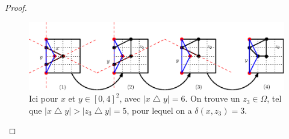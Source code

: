 \documentclass[11pt]{article}
\begin{document}
\begin{proof}





  \begin{figure}
    \begin{center}
      \includegraphics[scale=0.7]{assets/transfo}
      \caption{Ici pour $x$ et $y \in [0,4]^2$, avec $|x \bigtriangleup y| = 6$. On trouve un $z_3 \in \Omega$, tel que $|x \bigtriangleup y| > |z_3 \bigtriangleup y| = 5$, pour lequel on a $\delta(x,z_3) = 3$.}
      \label{fig:transfo}
    \end{center}
  \end{figure}
\end{proof}
\end{document}
